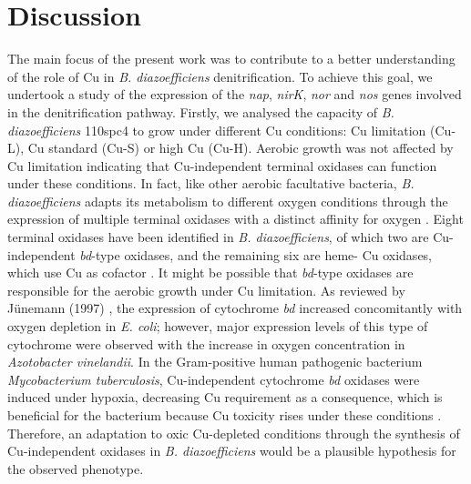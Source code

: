 \documentclass[a4paper,11pt]{article}
\begin{document}
\section{Discussion}
The main focus of the present work was to contribute to a better understanding of the
role of Cu in {\em B. diazoefficiens} denitrification. To achieve this goal, we undertook a
study of the expression of the {\em nap}, {\em nirK}, {\em nor} and {\em nos} genes involved in the denitrification pathway. Firstly, we analysed the capacity of
{\em B. diazoefficiens} 110spc4 to grow under different Cu conditions: Cu limitation (Cu-L), Cu
standard (Cu-S) or high Cu (Cu-H). Aerobic growth was not affected by Cu limitation
indicating that Cu-independent terminal oxidases can function under these conditions. In
fact, like other aerobic facultative bacteria, {\em B. diazoefficiens} adapts its metabolism to different
oxygen conditions through the expression of multiple terminal oxidases with a distinct
affinity for oxygen \cite{delgado1998genes}. Eight terminal oxidases have been identified in {\em B. diazoefficiens},
of which two are Cu-independent {\em bd}-type oxidases, and the remaining six are heme-
Cu oxidases, which use Cu as cofactor \cite{buhler2010disparate}. It might be possible that {\em bd}-type oxidases
are responsible for the aerobic growth under Cu limitation. As reviewed by Jünemann
(1997) \cite{junemann1997cytochrome}, the expression of cytochrome {\em bd} increased concomitantly with oxygen depletion
in {\em E. coli}; however, major expression levels of this type of cytochrome were observed with
the increase in oxygen concentration in {\em Azotobacter vinelandii}. In the Gram-positive human
pathogenic bacterium {\em Mycobacterium tuberculosis}, Cu-independent cytochrome {\em bd} oxidases
were induced under hypoxia, decreasing Cu requirement as a consequence, which is
beneficial for the bacterium because Cu toxicity rises under these conditions \cite{marcus2016csor}. Therefore,
an adaptation to oxic Cu-depleted conditions through the synthesis of Cu-independent
oxidases in {\em B. diazoefficiens} would be a plausible hypothesis for the observed phenotype.
\end{document}
